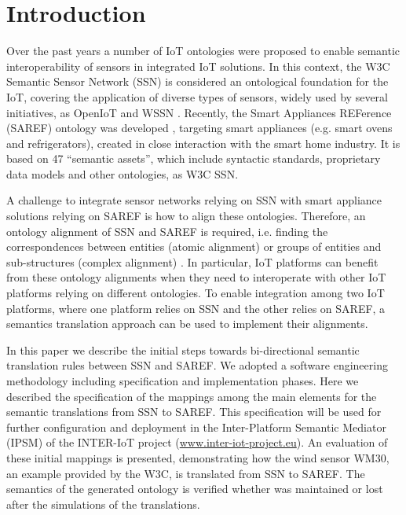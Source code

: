 \documentclass{sig-alternate-05-2015}
\begin{document}
%
%

%
%
\printccsdesc



\section{Introduction}

Over the past years a number of IoT ontologies were proposed to enable semantic interoperability of sensors in integrated IoT solutions. In this context, the W3C Semantic Sensor Network (SSN) is considered an ontological foundation for the IoT, covering the application of diverse types of sensors, widely used by several initiatives, as OpenIoT and WSSN \cite{Ganzha2016a}. 
Recently, the Smart Appliances REFerence (SAREF) ontology was developed \cite{Daniele2015}, targeting smart appliances (e.g. smart ovens and refrigerators), created in close interaction with the smart home industry. It is based on 47 “semantic assets”, which include syntactic standards, proprietary data models and other ontologies, as W3C SSN. 

A challenge to integrate sensor networks relying on SSN with smart appliance solutions relying on SAREF is how to align these ontologies. Therefore, an ontology alignment of SSN and SAREF is required, i.e. finding the correspondences between entities (atomic alignment) or groups of entities and sub-structures (complex alignment) \cite{Ganzha2015}. In particular, IoT platforms can benefit from these ontology alignments when they need to interoperate with other IoT platforms relying on different ontologies. To enable integration among two IoT platforms, where one platform relies on SSN and the other relies on SAREF, a semantics translation approach can be used to implement their alignments.  

In this paper we describe the initial steps towards bi-directional semantic translation rules between SSN and SAREF. We adopted a software engineering methodology including specification and implementation phases. Here we described the specification of the mappings among the main elements for the semantic translations from SSN to SAREF. This specification will be used for further configuration and deployment in the Inter-Platform Semantic Mediator (IPSM) of the INTER-IoT project (\url{www.inter-iot-project.eu}). An evaluation of these initial mappings is presented, demonstrating how the wind sensor WM30, an example provided by the W3C, is translated from SSN to SAREF. The semantics of the generated ontology is verified whether was maintained or lost after the simulations of the translations. 
\end{document}
